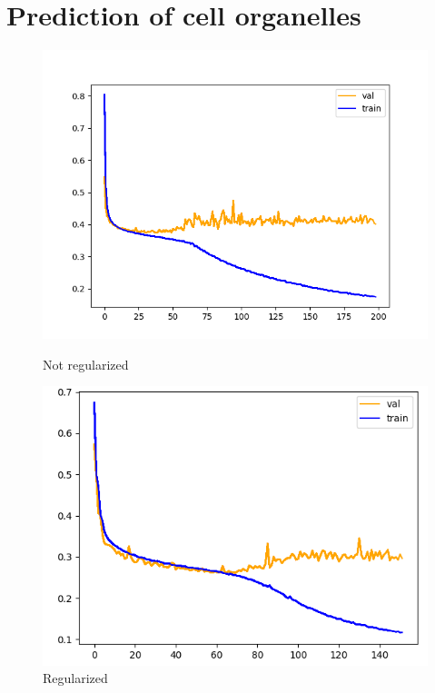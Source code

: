 \section{Prediction of cell organelles}
\begin{figure}[htb]
    \centering
    \begin{minipage}{.5\textwidth}
      \centering
      \includegraphics[width=\linewidth]{bilder/firt-train-overfit.png}
      \caption{Not regularized}
      \label{fig:first-train-overfit}
    \end{minipage}%
    \begin{minipage}{.5\textwidth}
      \centering
      \includegraphics[width=\linewidth]{bilder/first-train-regularized.png}
      \caption{Regularized}
      \label{fig:first-train-regularized}
    \end{minipage}
\end{figure}


